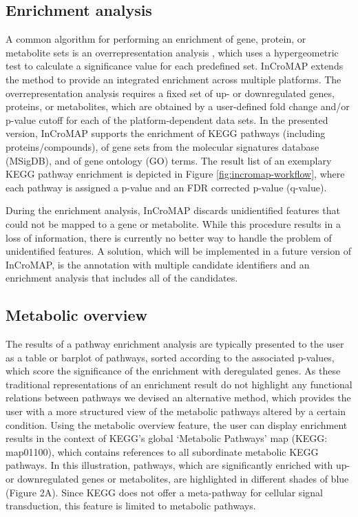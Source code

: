 \documentclass[final,5p,times,twocolumn]{elsarticle}
\begin{document}
\subsection{Enrichment analysis}
A common algorithm for performing an enrichment of gene, protein, or metabolite sets is an overrepresentation analysis \cite{Backes2007}, which uses a hypergeometric test to calculate a significance value for each predefined set. InCroMAP extends the method to provide an integrated enrichment across multiple platforms. The overrepresentation analysis requires a fixed set of up- or downregulated genes, proteins, or metabolites, which are obtained by a user-defined fold change and/or p-value cutoff for each of the platform-dependent data sets. In the presented version, InCroMAP supports the enrichment of KEGG pathways (including proteins/compounds), of gene sets from the molecular signatures database (MSigDB), and of gene ontology (GO) terms. The result list of an exemplary KEGG pathway enrichment is depicted in Figure \ref{fig:incromap-workflow}, where each pathway is assigned a p-value and an FDR corrected p-value (q-value).

During the enrichment analysis, InCroMAP discards unidientified features that could not be mapped to a gene or metabolite. While this procedure results in a loss of information, there is currently no better way to handle the problem of unidentified features. A solution, which will be implemented in a future version of InCroMAP, is the annotation with multiple candidate identifiers and an enrichment analysis that includes all of the candidates.

\subsection{Metabolic overview}
The results of a pathway enrichment analysis are typically presented to the user as a table or barplot of pathways, sorted according to the associated p-values, which score the significance of the enrichment with deregulated genes. As these traditional representations of an enrichment result do not highlight any functional relations between pathways we devised an alternative method, which provides the user with a more structured view of the metabolic pathways altered by a certain condition. Using the metabolic overview feature, the user can display enrichment results in the context of KEGG's global `Metabolic Pathways' map (KEGG: map01100), which contains references to all subordinate metabolic KEGG pathways. In this illustration, pathways, which are significantly enriched with up- or downregulated genes or metabolites, are highlighted in different shades of blue (Figure 2A). Since KEGG does not offer a meta-pathway for cellular signal transduction, this feature is limited to metabolic pathways.
\end{document}

